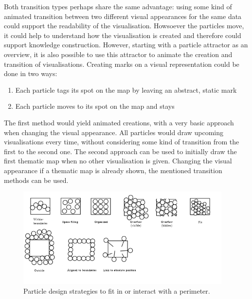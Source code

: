 Both transition types perhaps share the same advantage: using some kind of animated transition between two different visual appearances for the same data could support the readability of the visualisation. Howsoever the particles move, it could help to understand how the visualisation is created and therefore could support knowledge construction.
However, starting with a particle attractor as an overview, it is also possible to use this attractor to animate the creation and transition of visualisations. Creating marks on a visual representation could be done in two ways:

\begin{enumerate}
\item Each particle tags its spot on the map by leaving an abstract, static mark
\item Each particle moves to its spot on the map and stays
\end{enumerate}

The first method would yield animated creations, with a very basic approach when changing the visual appearance. All particles would draw upcoming visualisations every time, without considering some kind of transition from the first to the second one. The second approach can be used to initially draw the first thematic map when no other visualisation is given. Changing the visual appearance if a thematic map is already shown, the mentioned transition methods can be used.

\begin{figure}[!htb]
\centering
\includegraphics[height=5cm]{images/methods/related/strategies.png}
\caption[
    Particle design strategies to fit in or interact with a perimeter.
]{Particle design strategies to fit in or interact with a perimeter.}
\label{fig:particle-design-strategies}
\end{figure}

